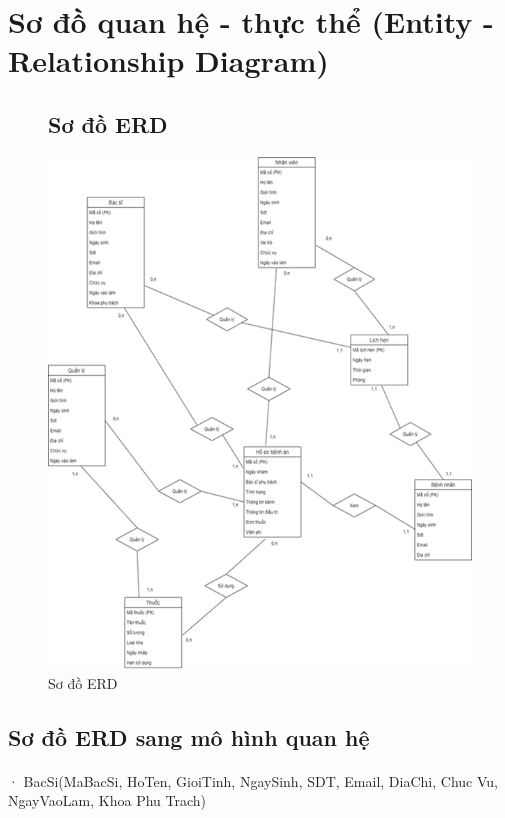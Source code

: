 \documentclass{report}
\begin{document}
\section{Sơ đồ quan hệ - thực thể (Entity - Relationship Diagram) }
\begin{center}
	\begin{figure}[!htp]
		\subsection{Sơ đồ ERD}
		\begin{center}
			\includegraphics[scale=1]{Hinh/ERD.png}
		\end{center}
		\caption{Sơ đồ ERD}
	\end{figure}
\end{center}

\pagebreak
\subsection{Sơ đồ ERD sang mô hình quan hệ}
\paragraph{}
· BacSi(MaBacSi, HoTen, GioiTinh, NgaySinh, SDT, Email, DiaChi, Chuc Vu, NgayVaoLam, Khoa Phu Trach)
\end{document}
